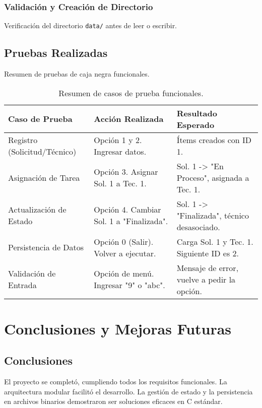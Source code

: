 \documentclass[12pt, letterpaper]{article}
\begin{document}
\subsubsection{Validación y Creación de Directorio}
Verificación del directorio \texttt{data/} antes de leer o escribir.


\subsection{Pruebas Realizadas}
Resumen de pruebas de caja negra funcionales.

\begin{table}[h]
\centering
\begin{tabular}{|p{4cm}|p{5cm}|p{5cm}|}
\hline
\textbf{Caso de Prueba} & \textbf{Acción Realizada} & \textbf{Resultado Esperado} \\
\hline
Registro (Solicitud/Técnico) & Opción 1 y 2. Ingresar datos. & Ítems creados con ID 1. \\
\hline
Asignación de Tarea & Opción 3. Asignar Sol. 1 a Tec. 1. & Sol. 1 -> "En Proceso", asignada a Tec. 1. \\
\hline
Actualización de Estado & Opción 4. Cambiar Sol. 1 a "Finalizada". & Sol. 1 -> "Finalizada", técnico desasociado. \\
\hline
Persistencia de Datos & Opción 0 (Salir). Volver a ejecutar. & Carga Sol. 1 y Tec. 1. Siguiente ID es 2. \\
\hline
Validación de Entrada & Opción de menú. Ingresar "9" o "abc". & Mensaje de error, vuelve a pedir la opción. \\
\hline
\end{tabular}
\caption{Resumen de casos de prueba funcionales.}
\label{tab:pruebas}
\end{table}


\section{Conclusiones y Mejoras Futuras}

\subsection{Conclusiones}
El proyecto se completó, cumpliendo todos los requisitos funcionales. La arquitectura modular facilitó el desarrollo. La gestión de estado y la persistencia en archivos binarios demostraron ser soluciones eficaces en C estándar.
\end{document}
